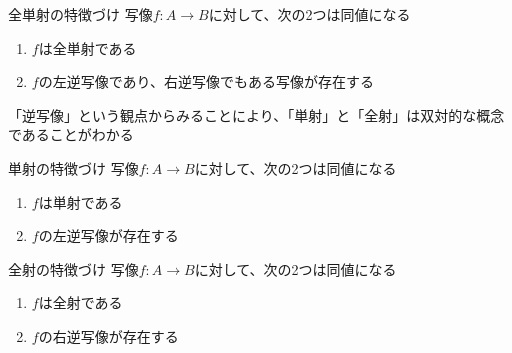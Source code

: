 \documentclass[../../../topic_mapping]{subfiles}
\begin{document}
\begin{theorem}{全単射の特徴づけ}
  写像$f\colon A \to B$に対して、次の2つは同値になる
  \begin{enumerate}
    \item $f$は全単射である
    \item $f$の左逆写像であり、右逆写像でもある写像が存在する
  \end{enumerate}
\end{theorem}

\sectionline

「逆写像」という観点からみることにより、「単射」と「全射」は双対的な概念であることがわかる

\begin{theorem}{単射の特徴づけ}
  写像$f\colon A \to B$に対して、次の2つは同値になる
  \begin{enumerate}
    \item $f$は単射である
    \item $f$の左逆写像が存在する
  \end{enumerate}
\end{theorem}

\begin{theorem}{全射の特徴づけ}
  写像$f\colon A \to B$に対して、次の2つは同値になる
  \begin{enumerate}
    \item $f$は全射である
    \item $f$の右逆写像が存在する
  \end{enumerate}
\end{theorem}
\end{document}
